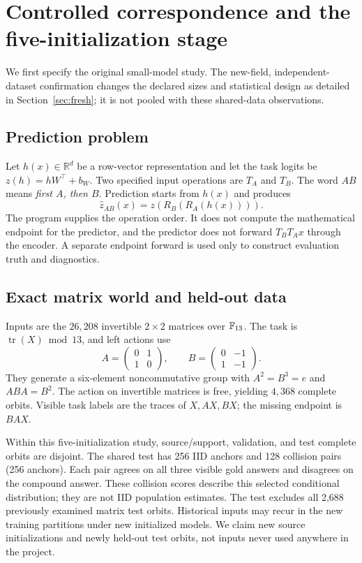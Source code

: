 \section{Controlled correspondence and the five-initialization stage}
We first specify the original small-model study. The new-field, independent-dataset confirmation changes the declared sizes and statistical design as detailed in Section~\ref{sec:fresh}; it is not pooled with these shared-data observations.
\subsection{Prediction problem}
Let $h(x)\in\mathbb{R}^{d}$ be a row-vector representation and let the task logits be
$z(h)=hW^\top+b_W$. Two specified input operations are $T_A$ and $T_B$.
The word $AB$ means \emph{first $A$, then $B$}. Prediction starts from $h(x)$ and produces
\[
 \widehat z_{AB}(x)=z\!\left(R_B(R_A(h(x)))\right).
\]
The program supplies the operation order. It does not compute the mathematical endpoint for the predictor, and the predictor does not forward $T_BT_Ax$ through the encoder. A separate endpoint forward is used only to construct evaluation truth and diagnostics.

\subsection{Exact matrix world and held-out data}
Inputs are the $26{,}208$ invertible $2\times2$ matrices over $\mathbb{F}_{13}$.
The task is $\operatorname{tr}(X)\bmod13$, and left actions use
\[
A=\begin{pmatrix}0&1\\1&0\end{pmatrix},\qquad
B=\begin{pmatrix}0&-1\\1&-1\end{pmatrix}.
\]
They generate a six-element noncommutative group with $A^2=B^3=e$ and $ABA=B^2$.
The action on invertible matrices is free, yielding $4{,}368$ complete orbits.
Visible task labels are the traces of $X,AX,BX$; the missing endpoint is $BAX$.

Within this five-initialization study, source/support, validation, and test complete orbits are disjoint. The shared test has 256 IID anchors and 128 collision pairs (256 anchors). Each pair agrees on all three visible gold answers and disagrees on the compound answer. These collision scores describe this selected conditional distribution; they are not IID population estimates. The test excludes all 2,688 previously examined matrix test orbits. Historical inputs may recur in the new training partitions under new initialized models. We claim new source initializations and newly held-out test orbits, not inputs never used anywhere in the project.

